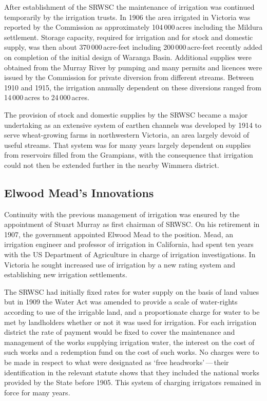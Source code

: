 After establishment of the SRWSC the maintenance of irrigation was
continued temporarily by the irrigation trusts.  In 1906 the area
irrigated in Victoria was reported by the Commission as approximately
104\,000\,acres including the Mildura settlement.  Storage capacity, required for irrigation and for stock and
domestic supply, was then about 370\,000\,acre-feet including
200\,000\,acre-feet recently added on completion of the initial design
of Waranga Basin.  Additional supplies were obtained from the Murray
River by pumping and many permits and licences were issued by the
Commission for private diversion from different streams.  Between 1910
and 1915, the irrigation annually dependent on these diversions ranged
from 14\,000\,acres to 24\,000\,acres.

The provision of stock and domestic supplies by the SRWSC became a
major undertaking as an extensive system of earthen channels was
developed by 1914 to serve wheat-growing farms in northwestern
Victoria, an area largely devoid of useful streams. That system was
for many years largely dependent on supplies from reservoirs filled
from the Grampians, with the consequence that irrigation could not
then be extended further in the nearby Wimmera
district.

\subsection*{Elwood Mead's Innovations}

Continuity with the previous management of irrigation was ensured by
the appointment of Stuart Murray  as first chairman
of SRWSC.  On his retirement in 1907, the government appointed Elwood
Mead to the position.  Mead, an irrigation engineer and professor of
irrigation in California, had spent ten years with the US Department
of Agriculture in charge of irrigation investigations.  In Victoria he
sought increased use of irrigation by a new rating system and
establishing new irrigation settlements.

The SRWSC had initially fixed rates for water supply on the basis of
land values but in 1909 the Water Act  was amended to provide a scale of water-rights according to
use of the irrigable land, and a proportionate charge for water to be
met by landholders whether or not it was used for irrigation.  For
each irrigation district the rate of payment would be fixed to cover
the maintenance and management of the works supplying irrigation
water, the interest on the cost of such works and a redemption fund on
the cost of such works.  No charges were to be made in respect to what
were designated as `free headworks'\,---\,their identification in the
relevant statute shows that they included the national works provided
by the State before 1905.  This system of charging irrigators remained
in force for many years.

